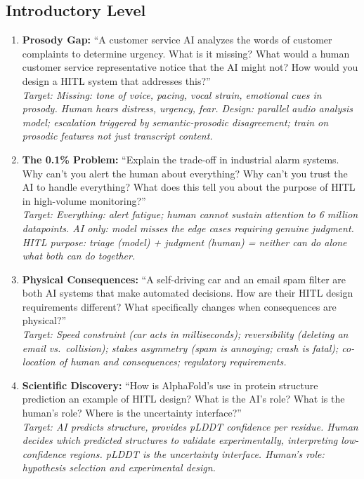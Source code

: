 \subsection{Introductory Level}

\begin{enumerate}
    \item \textbf{Prosody Gap:} ``A customer service AI analyzes the words of customer complaints to determine urgency. What is it missing? What would a human customer service representative notice that the AI might not? How would you design a HITL system that addresses this?''\\
    \textit{Target: Missing: tone of voice, pacing, vocal strain, emotional cues in prosody. Human hears distress, urgency, fear. Design: parallel audio analysis model; escalation triggered by semantic-prosodic disagreement; train on prosodic features not just transcript content.}

    \item \textbf{The 0.1\% Problem:} ``Explain the trade-off in industrial alarm systems. Why can't you alert the human about everything? Why can't you trust the AI to handle everything? What does this tell you about the purpose of HITL in high-volume monitoring?''\\
    \textit{Target: Everything: alert fatigue; human cannot sustain attention to 6 million datapoints. AI only: model misses the edge cases requiring genuine judgment. HITL purpose: triage (model) + judgment (human) = neither can do alone what both can do together.}

    \item \textbf{Physical Consequences:} ``A self-driving car and an email spam filter are both AI systems that make automated decisions. How are their HITL design requirements different? What specifically changes when consequences are physical?''\\
    \textit{Target: Speed constraint (car acts in milliseconds); reversibility (deleting an email vs.\ collision); stakes asymmetry (spam is annoying; crash is fatal); co-location of human and consequences; regulatory requirements.}

    \item \textbf{Scientific Discovery:} ``How is AlphaFold's use in protein structure prediction an example of HITL design? What is the AI's role? What is the human's role? Where is the uncertainty interface?''\\
    \textit{Target: AI predicts structure, provides pLDDT confidence per residue. Human decides which predicted structures to validate experimentally, interpreting low-confidence regions. pLDDT is the uncertainty interface. Human's role: hypothesis selection and experimental design.}
\end{enumerate}

